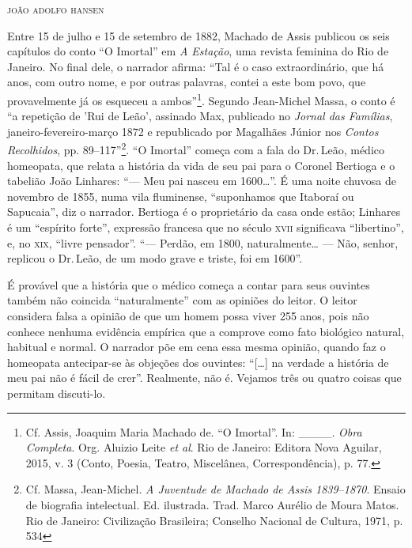 \begin{flushright}
\textsc{joão adolfo hansen}
\end{flushright}

Entre 15 de julho e 15 de setembro de 1882, Machado de Assis publicou os
seis capítulos do conto ``O Imortal'' em \emph{A Estação}, uma revista
feminina do Rio de Janeiro. No final dele, o narrador afirma: ``Tal é o
caso extraordinário, que há anos, com outro nome, e por outras palavras,
contei a este bom povo, que provavelmente já os esqueceu a
ambos''\footnote{Cf. Assis, Joaquim Maria Machado de. ``O Imortal''. In:
  \_\_\_\_. \emph{Obra Completa}. Org. Aluizio Leite \emph{et al}. Rio
  de Janeiro: Editora Nova Aguilar, 2015, v. 3 (Conto, Poesia, Teatro,
  Miscelânea, Correspondência), p. 77.}. Segundo Jean-Michel Massa, o
conto é ``a repetição de 'Rui de Leão', assinado Max, publicado no
\emph{Jornal das Famílias}, janeiro-fevereiro-março 1872 e republicado
por Magalhães Júnior nos \emph{Contos Recolhidos}, pp. 89--117''\footnote{Cf.
  Massa, Jean-Michel. \emph{A Juventude de Machado de Assis 1839--1870}.
  Ensaio de biografia intelectual. Ed. ilustrada. Trad. Marco Aurélio de
  Moura Matos. Rio de Janeiro: Civilização Brasileira; Conselho Nacional
  de Cultura, 1971, p. 534}. ``O Imortal'' começa com a fala do Dr.\,Leão,
médico homeopata, que relata a história da vida de seu pai para o
Coronel Bertioga e o tabelião João Linhares: ``--- Meu pai nasceu em
1600\ldots{}''. É uma noite chuvosa de novembro de 1855, numa vila fluminense,
``suponhamos que Itaboraí ou Sapucaia'', diz o narrador. Bertioga é o
proprietário da casa onde estão; Linhares é um ``espírito forte'',
expressão francesa que no século \textsc{xvii} significava ``libertino'', e, no
\textsc{xix}, ``livre pensador''. ``--- Perdão, em 1800, naturalmente\ldots{} --- Não,
senhor, replicou o Dr.\,Leão, de um modo grave e triste, foi em 1600''.

É provável que a história que o médico começa a contar para seus
ouvintes também não coincida ``naturalmente'' com as opiniões do leitor. O
leitor considera falsa a opinião de que um homem possa viver 255 anos,
pois não conhece nenhuma evidência empírica que a comprove como fato
biológico natural, habitual e normal. O narrador põe em cena essa mesma
opinião, quando faz o homeopata antecipar-se às objeções dos ouvintes:
``{[}\ldots{}{]} na verdade a história de meu pai não é fácil de crer''.
Realmente, não é. Vejamos três ou quatro coisas que permitam discuti-lo.


